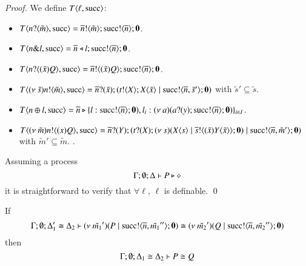 \begin{proof}
	\noi We define $T\langle \ell, \textrm{succ} \rangle$:
%
	\begin{itemize}
		\item	$T\langle n ? \langle \tilde{m} \rangle, \textrm{succ} \rangle = \overline{n} ! \langle \tilde{m} \rangle ; \textrm{succ} ! \langle \overline{n} \rangle ; \mathbf{0}$.

		\item	$T\langle n \& l, \textrm{succ} \rangle = \overline{n} \triangleleft l ; \textrm{succ} ! \langle \overline{n} \rangle ; \mathbf{0}$.

		\item	$T\langle n ? \langle (\tilde{x})Q \rangle, \textrm{succ} \rangle = \overline{n} ! \langle (\tilde{x})Q \rangle ; \textrm{succ} ! \langle \overline{n} \rangle ; \mathbf{0}$.

		\item	$T\langle (\nu\ \tilde{s}) n ! \langle \tilde{m} \rangle, \textrm{succ} \rangle = \overline{n} ? (\tilde{x}) ; (t ! \langle X \rangle ; X\langle \tilde{x} \rangle \;|\; \textrm{succ} ! \langle \overline{n}, \tilde{s}' \rangle ; \mathbf{0})$
			with $\tilde{s}' \subseteq \tilde{s}$.

		\item	$T\langle n \oplus l, \textrm{succ} \rangle = \overline{n} \triangleright \{l: \textrm{succ} ! \langle \overline{n} \rangle ; \mathbf{0}), l_i: (\nu\ a)(a ? (y) ; \textrm{succ} ! \langle \overline{n} \rangle ; \mathbf{0})\}_{i \in I}$.

		\item	$T\langle (\nu\ \tilde{m}) n ! \langle (x)Q \rangle, \textrm{succ} \rangle = \overline{n} ? (Y) ; (t ? (X) ; (\nu\ s)(X\langle s \rangle \;|\; \overline{s} ! \langle (\tilde{x}) Y\langle \tilde{x} \rangle \rangle ; \mathbf{0}) \;|\; \textrm{succ} ! \langle \overline{n}, \tilde{m}' \rangle ; \mathbf{0})$ with $\tilde{m}' \subseteq \tilde{m}$.
.
	\end{itemize}

	\noi Assuming a process 
	\[
		\Gamma; \emptyset; \Delta \vdash P \triangleright \diamond
	\] 
	\noi it is straightforward to verify that $\forall \ell$, $\ell$ is definable.
	\qed
\end{proof}

\begin{lemma}[Extrusion]\rm
	\label{lem:extrusion}
	If 
	\[
		\Gamma; \emptyset; \Delta_1' \cong \Delta_2 \vdash (\nu\ \tilde{m_1}')(P \;|\; \textrm{succ} ! \langle \overline{n}, \tilde{m_1}'' \rangle ; \mathbf{0}) \cong (\nu\ \tilde{m_2}')(Q \;|\; \textrm{succ} ! \langle \overline{n}, \tilde{m_2}'' \rangle ; \mathbf{0})
	\]
	then
	\[
		\Gamma; \emptyset; \Delta_1 \cong \Delta_2 \vdash P \cong Q
	\]
\end{lemma}

